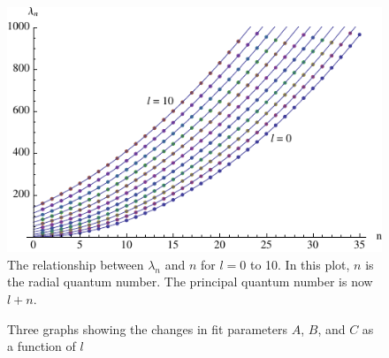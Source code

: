 \documentclass[12pt,twoside]{reedthesis}
\begin{document}
\begin{figure}[h]
\centering
\includegraphics{Figures/allthelcs}
\caption[Plots of $\lambda_n$ versus $n$ for $l = 0$ to $10$]{The relationship between $\lambda_n$ and $n$ for $l = 0$ to 10. In this plot, $n$ is the radial quantum number. The principal quantum number is now $l + n$.}
\label{fig:allthelcs}
\end{figure}
\begin{figure}[h]
\centering {}
\caption[Fit parameters for $l = 0$ to 10]{Three graphs showing the changes in fit parameters $A$, $B$, and $C$ as a function of $l$}
\label{fig:parameters}
\end{figure}
\end{document}
